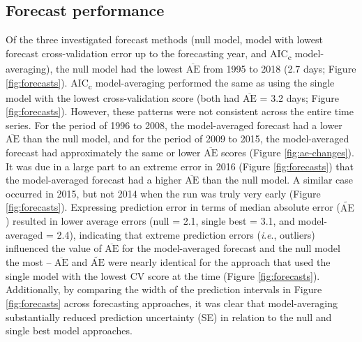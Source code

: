 \documentclass[12pt,]{book}
\theoremstyle{definition}
\theoremstyle{definition}
\theoremstyle{definition}
\theoremstyle{remark}
\begin{document}
\subsection{Forecast performance}\label{forecast-performance}

\noindent
Of the three investigated forecast methods (null model, model with
lowest forecast cross-validation error up to the forecasting year, and
AIC\textsubscript{c} model-averaging), the null model had the lowest
\(\overline{\text{AE}}\) from 1995 to 2018 (2.7 days; Figure
\ref{fig:forecasts}). AIC\textsubscript{c} model-averaging performed the
same as using the single model with the lowest cross-validation score
(both had \(\overline{\text{AE}}\) = 3.2 days; Figure
\ref{fig:forecasts}). However, these patterns were not consistent across
the entire time series. For the period of 1996 to 2008, the
model-averaged forecast had a lower \(\overline{\text{AE}}\) than the
null model, and for the period of 2009 to 2015, the model-averaged
forecast had approximately the same or lower \(\overline{\text{AE}}\)
scores (Figure \ref{fig:ae-changes}). It was due in a large part to an
extreme error in 2016 (Figure \ref{fig:forecasts}) that the
model-averaged forecast had a higher \(\overline{\text{AE}}\) than the
null model. A similar case occurred in 2015, but not 2014 when the run
was truly very early (Figure \ref{fig:forecasts}). Expressing prediction
error in terms of median absolute error (\(\widetilde{\text{AE}}\))
resulted in lower average errors (null = 2.1, single best = 3.1, and
model-averaged = 2.4), indicating that extreme prediction errors
(\emph{i}.\emph{e}., outliers) influenced the value of
\(\overline{\text{AE}}\) for the model-averaged forecast and the null
model the most -- \(\overline{\text{AE}}\) and \(\widetilde{\text{AE}}\)
were nearly identical for the approach that used the single model with
the lowest CV score at the time (Figure \ref{fig:forecasts}).
Additionally, by comparing the width of the prediction intervals in
Figure \ref{fig:forecasts} across forecasting approaches, it was clear
that model-averaging substantially reduced prediction uncertainty (SE)
in relation to the null and single best model approaches.
\end{document}
